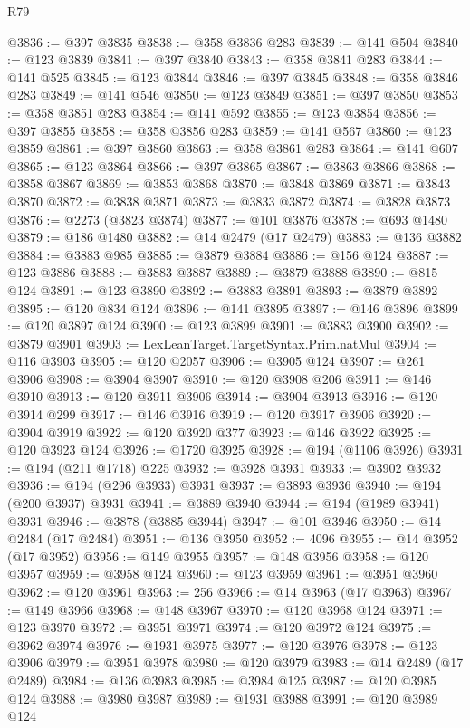 \begin{lexlean}{R79}
\begin{coremodule}
@3836 := @397 @3835
@3838 := @358 @3836 @283
@3839 := @141 @504
@3840 := @123 @3839
@3841 := @397 @3840
@3843 := @358 @3841 @283
@3844 := @141 @525
@3845 := @123 @3844
@3846 := @397 @3845
@3848 := @358 @3846 @283
@3849 := @141 @546
@3850 := @123 @3849
@3851 := @397 @3850
@3853 := @358 @3851 @283
@3854 := @141 @592
@3855 := @123 @3854
@3856 := @397 @3855
@3858 := @358 @3856 @283
@3859 := @141 @567
@3860 := @123 @3859
@3861 := @397 @3860
@3863 := @358 @3861 @283
@3864 := @141 @607
@3865 := @123 @3864
@3866 := @397 @3865
@3867 := @3863 @3866
@3868 := @3858 @3867
@3869 := @3853 @3868
@3870 := @3848 @3869
@3871 := @3843 @3870
@3872 := @3838 @3871
@3873 := @3833 @3872
@3874 := @3828 @3873
@3876 := @2273 (@3823 @3874)
@3877 := @101 @3876
@3878 := @693 @1480
@3879 := @186 @1480
@3882 := @14 @2479 (@17 @2479)
@3883 := @136 @3882
@3884 := @3883 @985
@3885 := @3879 @3884
@3886 := @156 @124
@3887 := @123 @3886
@3888 := @3883 @3887
@3889 := @3879 @3888
@3890 := @815 @124
@3891 := @123 @3890
@3892 := @3883 @3891
@3893 := @3879 @3892
@3895 := @120 @834 @124
@3896 := @141 @3895
@3897 := @146 @3896
@3899 := @120 @3897 @124
@3900 := @123 @3899
@3901 := @3883 @3900
@3902 := @3879 @3901
@3903 := LexLeanTarget.TargetSyntax.Prim.natMul
@3904 := @116 @3903
@3905 := @120 @2057
@3906 := @3905 @124
@3907 := @261 @3906
@3908 := @3904 @3907
@3910 := @120 @3908 @206
@3911 := @146 @3910
@3913 := @120 @3911 @3906
@3914 := @3904 @3913
@3916 := @120 @3914 @299
@3917 := @146 @3916
@3919 := @120 @3917 @3906
@3920 := @3904 @3919
@3922 := @120 @3920 @377
@3923 := @146 @3922
@3925 := @120 @3923 @124
@3926 := @1720 @3925
@3928 := @194 (@1106 @3926)
@3931 := @194 (@211 @1718) @225
@3932 := @3928 @3931
@3933 := @3902 @3932
@3936 := @194 (@296 @3933) @3931
@3937 := @3893 @3936
@3940 := @194 (@200 @3937) @3931
@3941 := @3889 @3940
@3944 := @194 (@1989 @3941) @3931
@3946 := @3878 (@3885 @3944)
@3947 := @101 @3946
@3950 := @14 @2484 (@17 @2484)
@3951 := @136 @3950
@3952 := 4096
@3955 := @14 @3952 (@17 @3952)
@3956 := @149 @3955
@3957 := @148 @3956
@3958 := @120 @3957
@3959 := @3958 @124
@3960 := @123 @3959
@3961 := @3951 @3960
@3962 := @120 @3961
@3963 := 256
@3966 := @14 @3963 (@17 @3963)
@3967 := @149 @3966
@3968 := @148 @3967
@3970 := @120 @3968 @124
@3971 := @123 @3970
@3972 := @3951 @3971
@3974 := @120 @3972 @124
@3975 := @3962 @3974
@3976 := @1931 @3975
@3977 := @120 @3976
@3978 := @123 @3906
@3979 := @3951 @3978
@3980 := @120 @3979
@3983 := @14 @2489 (@17 @2489)
@3984 := @136 @3983
@3985 := @3984 @125
@3987 := @120 @3985 @124
@3988 := @3980 @3987
@3989 := @1931 @3988
@3991 := @120 @3989 @124

\end{coremodule}
\end{lexlean}
